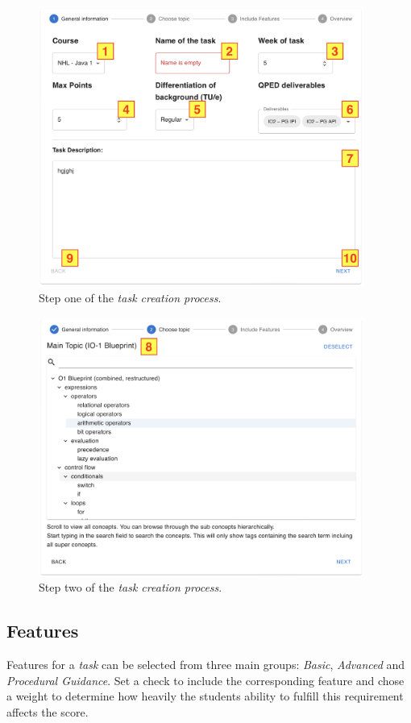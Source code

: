 \begin{figure}[h]
  \begin{center}
    \includegraphics[width=0.95\textwidth]{figures/taskcreation1}
  \end{center}
  \caption{Step one of the \textit{task creation process}.}
  \label{fig:taskcreation1}
\end{figure}

\begin{figure}[h]
  \begin{center}
    \includegraphics[width=0.95\textwidth]{figures/taskcreation2}
  \end{center}
  \caption{Step two of the \textit{task creation process}.}
  \label{fig:taskcreation2}
\end{figure}


\subsection{Features}
\label{sub:features}
Features for a \textit{task} can be selected from three main groups: \textit{Basic}, \textit{Advanced} and \textit{Procedural Guidance}.
Set a check to include the corresponding feature and chose a weight to determine how heavily the students ability to fulfill this requirement affects the score.

